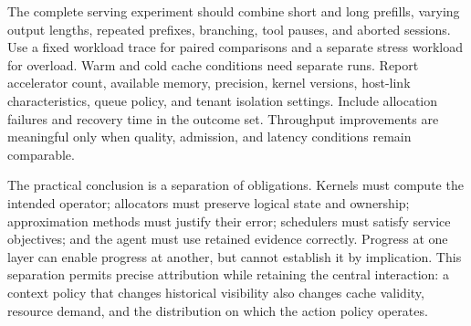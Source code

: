 The complete serving experiment should combine short and long prefills, varying output lengths, repeated prefixes, branching, tool pauses, and aborted sessions. Use a fixed workload trace for paired comparisons and a separate stress workload for overload. Warm and cold cache conditions need separate runs. Report accelerator count, available memory, precision, kernel versions, host-link characteristics, queue policy, and tenant isolation settings. Include allocation failures and recovery time in the outcome set. Throughput improvements are meaningful only when quality, admission, and latency conditions remain comparable.

The practical conclusion is a separation of obligations. Kernels must compute the intended operator; allocators must preserve logical state and ownership; approximation methods must justify their error; schedulers must satisfy service objectives; and the agent must use retained evidence correctly. Progress at one layer can enable progress at another, but cannot establish it by implication. This separation permits precise attribution while retaining the central interaction: a context policy that changes historical visibility also changes cache validity, resource demand, and the distribution on which the action policy operates.

